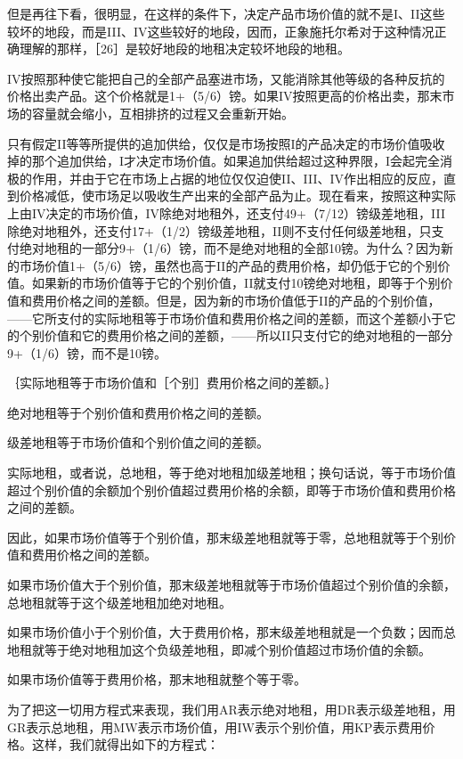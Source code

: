 但是再往下看，很明显，在这样的条件下，决定产品市场价值的就不是I、II这些较坏的地段，而是III、IV这些较好的地段，因而，正象施托尔希对于这种情况正确理解的那样，［26］是较好地段的地租决定较坏地段的地租。

IV按照那种使它能把自己的全部产品塞进市场，又能消除其他等级的各种反抗的价格出卖产品。这个价格就是1+（5/6）镑。如果IV按照更高的价格出卖，那末市场的容量就会缩小，互相排挤的过程又会重新开始。

只有假定II等等所提供的追加供给，仅仅是市场按照I的产品决定的市场价值吸收掉的那个追加供给，I才决定市场价值。如果追加供给超过这种界限，I会起完全消极的作用，并由于它在市场上占据的地位仅仅迫使II、III、IV作出相应的反应，直到价格减低，使市场足以吸收生产出来的全部产品为止。现在看来，按照这种实际上由IV决定的市场价值，IV除绝对地租外，还支付49+（7/12）镑级差地租，III除绝对地租外，还支付17+（1/2）镑级差地租，II则不支付任何级差地租，只支付绝对地租的一部分9+（1/6）镑，而不是绝对地租的全部10镑。为什么？因为新的市场价值1+（5/6）镑，虽然也高于II的产品的费用价格，却仍低于它的个别价值。如果新的市场价值等于它的个别价值，II就支付10镑绝对地租，即等于个别价值和费用价格之间的差额。但是，因为新的市场价值低于II的产品的个别价值，——它所支付的实际地租等于市场价值和费用价格之间的差额，而这个差额小于它的个别价值和它的费用价格之间的差额，——所以II只支付它的绝对地租的一部分9+（1/6）镑，而不是10镑。

｛实际地租等于市场价值和［个别］费用价格之间的差额。｝

绝对地租等于个别价值和费用价格之间的差额。

级差地租等于市场价值和个别价值之间的差额。

实际地租，或者说，总地租，等于绝对地租加级差地租；换句话说，等于市场价值超过个别价值的余额加个别价值超过费用价格的余额，即等于市场价值和费用价格之间的差额。

因此，如果市场价值等于个别价值，那末级差地租就等于零，总地租就等于个别价值和费用价格之间的差额。

如果市场价值大于个别价值，那末级差地租就等于市场价值超过个别价值的余额，总地租就等于这个级差地租加绝对地租。

如果市场价值小于个别价值，大于费用价格，那末级差地租就是一个负数；因而总地租就等于绝对地租加这个负级差地租，即减个别价值超过市场价值的余额。

如果市场价值等于费用价格，那末地租就整个等于零。

为了把这一切用方程式来表现，我们用AR表示绝对地租，用DR表示级差地租，用GR表示总地租，用MW表示市场价值，用IW表示个别价值，用KP表示费用价格。这样，我们就得出如下的方程式：

